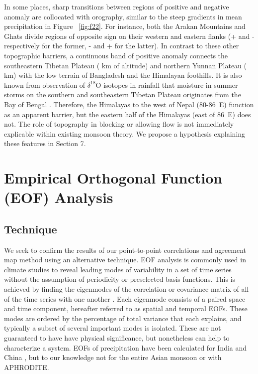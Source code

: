 	In some places, sharp transitions between regions of positive and negative anomaly are collocated with orography, similar to the steep gradients in mean precipitation in Figure ~\ref{fig:f22}. For instance, both the Arakan Mountains and Ghats divide regions of opposite sign on their western and eastern flanks (+ and - respectively for the former, - and + for the latter). In contrast to these other topographic barriers, a continuous band of positive anomaly connects the southeastern Tibetan Plateau ( km of altitude) and northern Yunnan Plateau  ( km) with the low terrain of Bangladesh and the Himalayan foothills. It is also known from observation of $\delta^{18}$O isotopes in rainfall that moisture in summer storms on the southern and southeastern Tibetan Plateau originates from the Bay of Bengal \citep{Yao2009,Gao2011,Yang2011}. Therefore, the Himalayas to the west of Nepal (80-86\textdegree\ E) function as an apparent barrier, but the eastern half of the Himalayas (east of 86\textdegree\ E) does not. The role of topography in blocking or allowing flow is not immediately explicable within existing monsoon theory. We propose a hypothesis explaining these features in Section 7.
	
\section{Empirical Orthogonal Function (EOF) Analysis}

\subsection{Technique}

	We seek to confirm the results of our point-to-point correlations and agreement map method using an alternative technique. EOF analysis is commonly used in climate studies to reveal leading modes of variability in a set of time series without the assumption of periodicity or preselected basis functions. This is achieved by finding the eigenmodes of the correlation or covariance matrix of all of the time series with one another \citep{Lorenz1956,Wilks2006}. Each eigenmode consists of a paired space and time component, hereafter referred to as spatial and temporal EOFs. These modes are ordered by the percentage of total variance that each explains, and typically a subset of several important modes is isolated. These are not guaranteed to have have physical significance, but nonetheless can help to characterize a system. EOFs of precipitation have been calculated for India \citep{Krishnamurthy2000} and China \citep{Ding2008}, but to our knowledge not for the entire Asian monsoon or with APHRODITE. 
	
